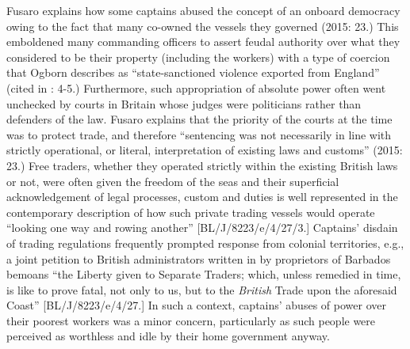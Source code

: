 Fusaro explains how some captains abused the concept of an onboard democracy owing to the fact that many co-owned the vessels they governed (2015: 23.) This emboldened many commanding officers to assert feudal authority over what they considered to be their property (including the workers) with a type of coercion that Ogborn describes as “state-sanctioned violence exported from England” (cited in \citealt{Fury2015}: 4-5.) Furthermore, such appropriation of absolute power often went unchecked by courts in Britain whose judges were politicians rather than defenders of the law. Fusaro explains that the priority of the courts at the time was to protect trade, and therefore “sentencing was not necessarily in line with strictly operational, or literal, interpretation of existing laws and customs” (2015: 23.) Free traders, whether they operated strictly within the existing British laws or not, were often given the freedom of the seas and their superficial acknowledgement of legal processes, custom and duties is well represented in the contemporary description of how such private trading vessels would operate “looking one way and rowing another” [BL/J/8223/e/4/27/3.] Captains’ disdain of trading regulations frequently prompted response from colonial territories, e.g., a joint petition to British administrators written in \citealt{August1709} by proprietors of Barbados bemoans “the Liberty given to Separate Traders; which, unless remedied in time, is like to prove fatal, not only to us, but to the \textit{British} Trade upon the aforesaid Coast” [BL/J/8223/e/4/27.] In such a context, captains’ abuses of power over their poorest workers was a minor concern, particularly as such people were perceived as worthless and idle by their home government anyway. 

